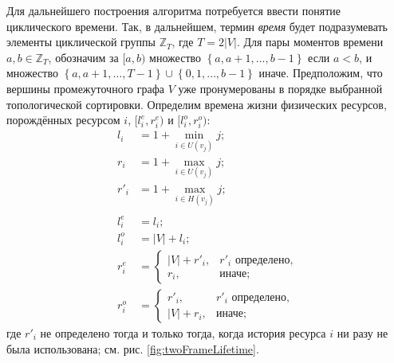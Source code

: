 Для дальнейшего построения алгоритма потребуется ввести понятие циклического времени.
Так, в дальнейшем, термин \textit{время} будет подразумевать элементы циклической группы $\mathbb{Z}_T$, где $T = 2\left|V\right|$.
Для пары моментов времени $a, b \in \mathbb{Z}_T$, обозначим за $[a, b)$ множество $\left\{a, a+1, \dots, b - 1\right\}$ если $a < b$, и множество $\left\{a, a + 1, \dots, T - 1\right\} \cup \left\{0,1, \dots, b - 1\right\}$ иначе.
Предположим, что вершины промежуточного графа $V$ уже пронумерованы в порядке выбранной топологической сортировки.
Определим времена жизни физических ресурсов, порождённых ресурсом $i$, $[l^e_i, r^e_i)$ и $[l^o_i, r^o_i)$:
\begin{align*}
l_i &= 1 + \min_{i \in U(v_j)} j\text{;}\\
r_i &= 1 + \max_{i \in U(v_j)} j\text{;}\\
r'_i &= 1 + \max_{i \in H(v_j)} j\text{;}\\
\\
l^e_i &= l_i\text{;}\\
l^o_i &= \left|V\right| + l_i\text{;}\\
r^e_i &=
    \begin{cases}
        \left|V\right| + r'_i, & \text{$r'_i$ определено,}\\
        r_i, & \text{иначе;}
    \end{cases} \\
r^o_i &=
\begin{cases}
    r'_i, & \text{$r'_i$ определено,}\\
    \left|V\right| + r_i, & \text{иначе;}
\end{cases}
\end{align*}
где $r'_i$ не определено тогда и только тогда, когда история ресурса $i$ ни разу не была использована; см. рис. \ref{fig:twoFrameLifetime}.
